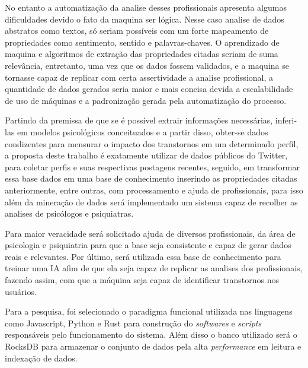 No entanto a automatização da analise desses profissionais apresenta algumas dificuldades devido o fato da maquina ser lógica. Nesse caso analise de dados abstratos como textos, só seriam possíveis com um forte mapeamento de propriedades como sentimento, sentido e palavras-chaves. O aprendizado de maquina e algoritmos de extração das propriedades citadas seriam de suma relevância, entretanto, uma vez que os dados fossem validados, e a maquina se tornasse capaz de replicar com certa assertividade a analise profissional, a quantidade de dados gerados seria maior e mais concisa devida a escalabilidade de uso de máquinas e a padronização gerada pela automatização do processo.

Partindo da premissa de que se é possível extrair informações necessárias, inferi-las em modelos psicológicos conceituados e a partir disso, obter-se dados condizentes para mensurar o impacto dos transtornos em um determinado perfil, a proposta deste trabalho é exatamente utilizar de dados públicos do Twitter, para coletar perfis e suas respectivas postagens recentes, seguido, em transformar essa base dados em uma base de conhecimento inserindo as propriedades citadas anteriormente, entre outras, com processamento e ajuda de profissionais, para isso além da mineração de dados será implementado um sistema capaz de recolher as analises de psicólogos e psiquiatras.

Para maior veracidade será solicitado ajuda de diversos profissionais, da área de psicologia e psiquiatria para que a base seja consistente e capaz de gerar dados reais e relevantes. Por último, será utilizada essa base de conhecimento para treinar uma IA afim de que ela seja capaz de replicar as analises dos profissionais, fazendo assim, com que a máquina seja capaz de identificar transtornos nos usuários.

Para a pesquisa, foi selecionado o paradigma funcional utilizada nas linguagens como Javascript, Python e Rust para construção do \textit{softwares} e \textit{scripts} responsáveis pelo funcionamento do sistema. Além disso o banco utilizado será o RocksDB para armazenar o conjunto de dados pela alta \textit{performance} em leitura e indexação de dados.


